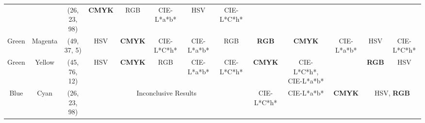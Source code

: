 \begin{table}[htbp]
{\begin{tabular}{@{}ccclcccccccccc@{}}
                            & \multicolumn{1}{c|}{}                          & \multicolumn{2}{c|}{\cellcolor[HTML]{0080FF}(26, 23, 98)}  & \multicolumn{1}{c|}{\cellcolor[HTML]{FFFFFF}\textbf{CMYK}} & \multicolumn{1}{c|}{RGB}           & \multicolumn{1}{c|}{CIE-L*a*b*} & \multicolumn{1}{c|}{HSV}        & \multicolumn{1}{c|}{CIE-L*C*h*} & \multicolumn{1}{c|}{}                                & \multicolumn{1}{c|}{}                                & \multicolumn{1}{c|}{}                             & \multicolumn{1}{c|}{}                             & \multicolumn{1}{c|}{}                             \\ \cmidrule(lr){3-9}
    \multirow{-2}{*}{Green} & \multicolumn{1}{c|}{\multirow{-2}{*}{Magenta}} & \multicolumn{2}{c}{\cellcolor[HTML]{FF8000}(49, 37, 5)}    & \multicolumn{1}{c|}{HSV}                                   & \multicolumn{1}{c|}{\textbf{CMYK}} & \multicolumn{1}{c|}{CIE-L*C*h*} & \multicolumn{1}{c|}{CIE-L*a*b*} & \multicolumn{1}{c|}{RGB}        & \multicolumn{1}{c|}{\multirow{-2}{*}{\textbf{RGB}}}  & \multicolumn{1}{c|}{\multirow{-2}{*}{\textbf{CMYK}}} & \multicolumn{1}{c|}{\multirow{-2}{*}{CIE-L*a*b*}} & \multicolumn{1}{c|}{\multirow{-2}{*}{HSV}}        & \multicolumn{1}{c|}{\multirow{-2}{*}{CIE-L*C*h*}} \\ \midrule
    Green                   & \multicolumn{1}{c|}{Yellow}                    & \multicolumn{2}{c|}{\cellcolor[HTML]{80FF00}(45, 76, 12)}  & \multicolumn{1}{c|}{HSV}                                   & \multicolumn{1}{c|}{\textbf{CMYK}} & \multicolumn{1}{c|}{RGB}        & \multicolumn{1}{c|}{CIE-L*a*b*} & \multicolumn{1}{c|}{CIE-L*C*h*} & \multicolumn{1}{c|}{\textbf{CMYK}}                   & \multicolumn{1}{c|}{CIE-L*C*h*, CIE-L*a*b*}          & \multicolumn{1}{c|}{}                             & \multicolumn{1}{c|}{\textbf{RGB}}                 & \multicolumn{1}{c|}{HSV}                          \\ \midrule
    Blue                    & \multicolumn{1}{c|}{Cyan}                      & \multicolumn{2}{c|}{\cellcolor[HTML]{0080FF}(26, 23, 98)}  & \multicolumn{5}{c|}{Inconclusive Results}                                                                                                                                                             & \multicolumn{1}{c|}{CIE-L*C*h*}                      & \multicolumn{1}{c|}{CIE-L*a*b*}                      & \multicolumn{1}{c|}{\textbf{CMYK}}                & \multicolumn{2}{c|}{HSV, \textbf{RGB}}                                                                \\ \midrule

\end{tabular}}
\end{table}
